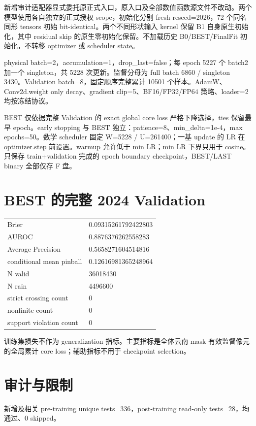 \documentclass[UTF8,11pt,fontset=windows]{ctexart}
\begin{document}
新增审计适配器显式委托原正式入口，原入口及全部数值函数源文件不改动。两个模型使用各自独立的正式授权 scope，初始化分别 fresh reseed=2026，72 个同名同形 tensors 初始 bit-identical。两个不同形状输入 kernel 保留 B1 自身原生初始化，其中 residual skip 的原生零初始化保留。不加载历史 B0/BEST/FinalFit 初始化，不转移 optimizer 或 scheduler state。

physical batch=2，accumulation=1，drop\_last=false；每 epoch 5227 个 batch2 加一个 singleton，共 5228 次更新。监督分母为 full batch 6860 / singleton 3430。Validation batch=8，固定顺序完整累计 10501 个样本。AdamW、Conv2d.weight only decay、gradient clip=5、BF16/FP32/FP64 策略、loader=2 均按冻结协议。

BEST 仅依据完整 Validation 的 exact global core loss 严格下降选择，ties 保留最早 epoch。early stopping 与 BEST 独立：patience=8、min\_delta=1e-4，max epochs=50。数学 scheduler 固定 W=5228 / U=261400；一基 update 的 LR 在 optimizer.step 前设置。warmup 允许低于 min LR；min LR 下界只用于 cosine。只保存 train+validation 完成的 epoch boundary checkpoint，BEST/LAST binary 全部仅存 F 盘。

\section*{BEST 的完整 2024 Validation}
\begin{tabularx}{\textwidth}{@{}p{41mm}Y@{}}\toprule
Brier & 0.09315261792422803 \\
AUROC & 0.8876376262558283 \\
Average Precision & 0.5658271604514816 \\
conditional mean pinball & 0.12616981365248964 \\
N valid & 36018430 \\
N rain & 4496600 \\
strict crossing count & 0 \\
nonfinite count & 0 \\
support violation count & 0 \\
\bottomrule\end{tabularx}

训练集损失不作为 generalization 指标。主要指标是全体云南 mask 有效监督像元的全局累计 core loss；辅助指标不用于 checkpoint selection。

\section*{审计与限制}
新增及相关 pre-training unique tests=336，post-training read-only tests=28，均通过、0 skipped。
\end{document}
